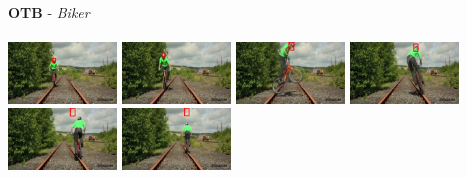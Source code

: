 \documentclass[10pt,twocolumn,letterpaper,french]{article}
\begin{document}
\begin{appendices}
\begin{center}
  \textbf{OTB} - \textit{Biker}\\
  \hspace{1cm}\\
  \includegraphics[width=82pt, cfbox=green 1pt 1pt]{images/exemples/bof/bike/000001.png}
  \includegraphics[width=82pt, cfbox=green 1pt 1pt]{images/exemples/bof/bike/000021.png}
  \includegraphics[width=82pt, cfbox=green 1pt 1pt]{images/exemples/bof/bike/000071.png}
  \includegraphics[width=82pt, cfbox=green 1pt 1pt]{images/exemples/bof/bike/000081.png}
  \includegraphics[width=82pt, cfbox=red 1pt 1pt]{images/exemples/bof/bike/000100.png}
  \includegraphics[width=82pt, cfbox=red 1pt 1pt]{images/exemples/bof/bike/000142.png}\\
  \hspace{1cm}\\
  \hspace{1cm}\\


\end{center}
\end{appendices}
\end{document}
